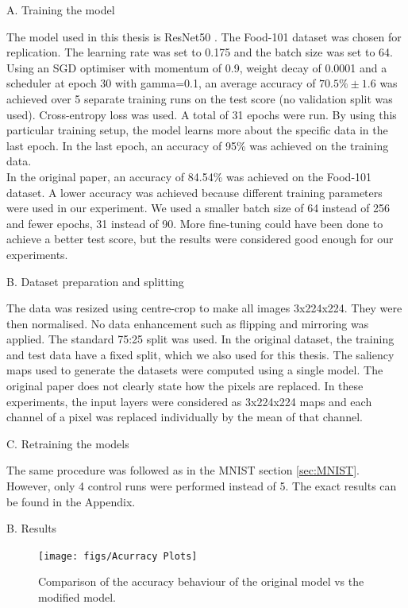 A. Training the model

The model used in this thesis is ResNet50 \cite{he2015deep}. The Food-101 \cite{bossard14} dataset was chosen for replication. The learning rate was set to 0.175 and the batch size was set to 64. Using an SGD optimiser with momentum of 0.9, weight decay of 0.0001 and a scheduler at epoch 30 with gamma=0.1, an average accuracy of $70.5\% \pm 1.6$ was achieved over 5 separate training runs on the test score (no validation split was used). Cross-entropy loss was used. A total of 31 epochs were run. By using this particular training setup, the model learns more about the specific data in the last epoch. In the last epoch, an accuracy of 95\% was achieved on the training data.\\
In the original paper, an accuracy of 84.54\% was achieved on the Food-101 dataset. A lower accuracy was achieved because different training parameters were used in our experiment. We used a smaller batch size of 64 instead of 256 and fewer epochs, 31 instead of 90. More fine-tuning could have been done to achieve a better test score, but the results were considered good enough for our experiments.

B. Dataset preparation and splitting

The data was resized using centre-crop to make all images 3x224x224. They were then normalised. No data enhancement such as flipping and mirroring was applied. The standard 75:25 split was used. In the original dataset, the training and test data have a fixed split, which we also used for this thesis. The saliency maps used to generate the datasets were computed using a single model. The original paper does not clearly state how the pixels are replaced. In these experiments, the input layers were considered as 3x224x224 maps and each channel of a pixel was replaced individually by the mean of that channel.

C. Retraining the models

The same procedure was followed as in the MNIST section \ref{sec:MNIST}. However, only 4 control runs were performed instead of 5. The exact results can be found in the Appendix.

B. Results

\begin{figure}[H]
	\centering
	\texttt{[image: figs/Acurracy Plots]}
	\caption {Comparison of the accuracy behaviour of the original model vs the modified model.}
	\label{fig:food101Res}
\end{figure}



